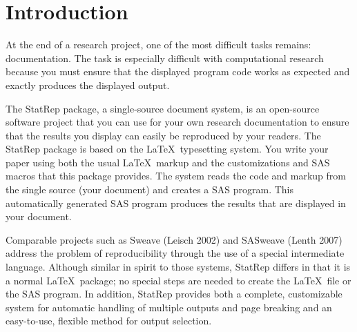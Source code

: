 \documentclass[article,oneside]{memoir}
\newcommand*{\StatRep}{\textsf{StatRep}\xspace}
\begin{document}
\chapter{Introduction}

At the end of a research project, one of the most difficult tasks remains: documentation.
The task is especially difficult with computational research because you
must ensure that the displayed program code works as expected and exactly produces the
displayed output.

The \StatRep package, a single-source document system,
is an open-source software project that you can use for your own research documentation
to ensure that the results you display can easily be reproduced by your readers.
The \StatRep package is based on the \LaTeX\ typesetting system. You write your paper using
both the usual \LaTeX\ markup and the customizations and SAS macros that this package provides.
The system reads the code and markup from the single source (your document) and creates a
SAS program. This automatically generated SAS program produces the results that are displayed
in your document.

Comparable projects such as Sweave (Leisch 2002) and SASweave  (Lenth 2007)
address the problem of reproducibility through the use of a special intermediate language.
Although similar in spirit to those systems, \StatRep differs in that it is a
normal \LaTeX\ package; no special steps are needed to create the \LaTeX\
file or the SAS program.   In addition, \StatRep provides both a complete, customizable system for
automatic handling of multiple outputs and page breaking and an easy-to-use,
flexible method for output selection.
\end{document}
